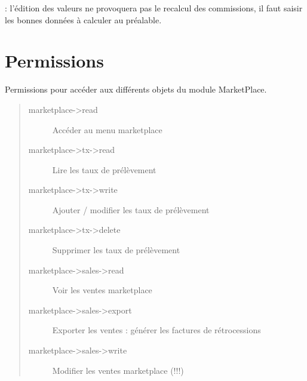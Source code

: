 \documentclass[letterpaper,10pt,english]{sphinxmanual}
\begin{document}
 : l'édition des valeurs ne provoquera pas le recalcul des commissions, il faut saisir les bonnes données à calculer au préalable.


\chapter{Permissions}
\label{\detokenize{permissions::doc}}\label{\detokenize{permissions:permissions}}
Permissions pour accéder aux différents objets du module MarketPlace.
\begin{quote}
\begin{description}
\item[{marketplace-\textgreater{}read}] \leavevmode
Accéder au menu marketplace

\item[{marketplace-\textgreater{}tx-\textgreater{}read}] \leavevmode
Lire les taux de prélèvement

\item[{marketplace-\textgreater{}tx-\textgreater{}write}] \leavevmode
Ajouter / modifier les taux de prélèvement

\item[{marketplace-\textgreater{}tx-\textgreater{}delete}] \leavevmode
Supprimer les taux de prélèvement

\item[{marketplace-\textgreater{}sales-\textgreater{}read}] \leavevmode
Voir les ventes marketplace

\item[{marketplace-\textgreater{}sales-\textgreater{}export}] \leavevmode
Exporter les ventes : générer les factures de rétrocessions

\item[{marketplace-\textgreater{}sales-\textgreater{}write}] \leavevmode
Modifier les ventes marketplace (!!!)

\end{description}
\end{quote}




\renewcommand{\indexname}{Index}
\printindex
\end{document}
